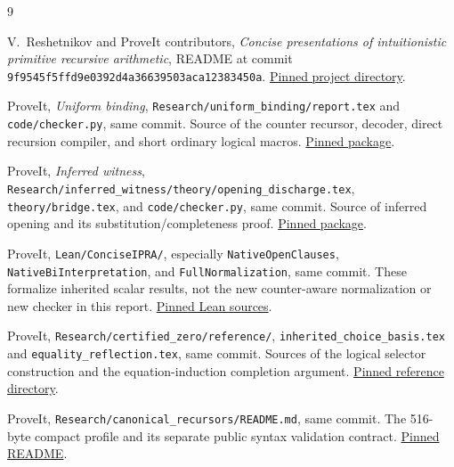 \documentclass[11pt]{article}
\theoremstyle{definition}
\theoremstyle{remark}
\begin{document}
\begin{thebibliography}{9}
\small\raggedright
{}
V.~Reshetnikov and ProveIt contributors,
\emph{Concise presentations of intuitionistic primitive recursive
arithmetic}, README at commit
\texttt{9f9545f5ffd9e0392d4a36639503aca12383450a}.
\href{https://github.com/VladimirReshetnikov/ProveIt/tree/9f9545f5ffd9e0392d4a36639503aca12383450a/Logic/PrimitiveRecursiveArithmetic/ConciseIPRA}
{Pinned project directory}.

ProveIt, \emph{Uniform binding},
\texttt{Research/uniform\_binding/report.tex} and
\texttt{code/checker.py}, same commit.
Source of the counter recursor, decoder,
direct recursion compiler, and short
ordinary logical macros.
\href{https://github.com/VladimirReshetnikov/ProveIt/tree/9f9545f5ffd9e0392d4a36639503aca12383450a/Logic/PrimitiveRecursiveArithmetic/ConciseIPRA/Research/uniform_binding}
{Pinned package}.

ProveIt, \emph{Inferred witness},
\texttt{Research/inferred\_witness/theory/opening\_discharge.tex},
\texttt{theory/bridge.tex}, and
\texttt{code/checker.py}, same commit.
Source of inferred opening and its
substitution/completeness proof.
\href{https://github.com/VladimirReshetnikov/ProveIt/tree/9f9545f5ffd9e0392d4a36639503aca12383450a/Logic/PrimitiveRecursiveArithmetic/ConciseIPRA/Research/inferred_witness}
{Pinned package}.

ProveIt, \texttt{Lean/ConciseIPRA/},
especially \texttt{NativeOpenClauses},
\texttt{NativeBiInterpretation},
and \texttt{FullNormalization}, same commit.
These formalize inherited scalar results,
not the new counter-aware normalization
or new checker in this report.
\href{https://github.com/VladimirReshetnikov/ProveIt/tree/9f9545f5ffd9e0392d4a36639503aca12383450a/Logic/PrimitiveRecursiveArithmetic/ConciseIPRA/Lean/ConciseIPRA}
{Pinned Lean sources}.

ProveIt, \texttt{Research/certified\_zero/reference/},
\texttt{inherited\_choice\_basis.tex} and
\texttt{equality\_reflection.tex}, same commit.
Sources of the logical selector
construction and the equation-induction
completion argument.
\href{https://github.com/VladimirReshetnikov/ProveIt/tree/9f9545f5ffd9e0392d4a36639503aca12383450a/Logic/PrimitiveRecursiveArithmetic/ConciseIPRA/Research/certified_zero/reference}
{Pinned reference directory}.

ProveIt, \texttt{Research/canonical\_recursors/README.md},
same commit. The 516-byte compact
profile and its separate public
syntax validation contract.
\href{https://github.com/VladimirReshetnikov/ProveIt/blob/9f9545f5ffd9e0392d4a36639503aca12383450a/Logic/PrimitiveRecursiveArithmetic/ConciseIPRA/Research/canonical_recursors/README.md}
{Pinned README}.


\end{thebibliography}
\end{document}
